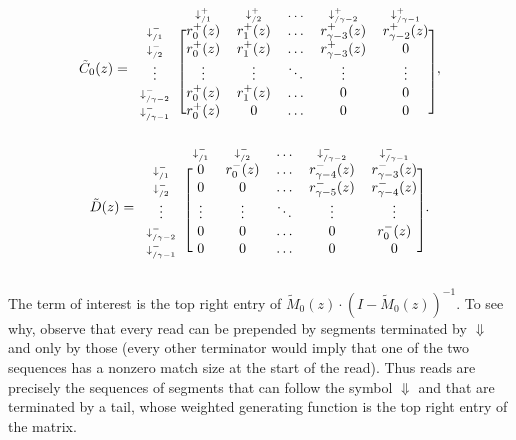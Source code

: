 \documentclass{article}
\begin{document}
\begin{equation*}
\tilde{C}_0(z) = 
\begin{blockarray}{cccccc}
   & \scriptstyle{\downarrow_{/1}^+} & \scriptstyle{\downarrow_{/2}^+} &
    \ldots & \scriptstyle{\downarrow_{/\gamma-2}^+} &
    \scriptstyle{\downarrow_{/\gamma-1}^+} \\
\begin{block}{c[ccccc]}
\scriptstyle{\downarrow_{/1}^-} & r_0^+(z) & r_1^+(z) & \ldots &
    r_{\gamma-3}^+(z) & r_{\gamma-2}^+(z) \\
\scriptstyle{\downarrow_{/2}^-} & r_0^+(z) & r_1^+(z) & \ldots &
    r_{\gamma-3}^+(z) & 0 \\
\vdots & \vdots & \vdots & \ddots & \vdots & \vdots \\
\scriptstyle{\downarrow_{/\gamma-2}^-} & r_0^+(z) & r_1^+(z) & \ldots &
    0 & 0 \\
\scriptstyle{\downarrow_{/\gamma-1}^-} & r_0^+(z) & 0 & \ldots & 0 & 0 \\
\end{block}
\end{blockarray},
\end{equation*}
\begin{equation*}
\tilde{D}(z) = 
\begin{blockarray}{cccccc}
   & \scriptstyle{\downarrow_{/1}^-} & \scriptstyle{\downarrow_{/2}^-} &
    \ldots & \scriptstyle{\downarrow_{/\gamma-2}^-} &
    \scriptstyle{\downarrow_{/\gamma-1}^-} \\
\begin{block}{c[ccccc]}
\scriptstyle{\downarrow_{/1}^-} & 0 & r_0^-(z) & \ldots &
    r_{\gamma-4}^-(z) & r_{\gamma-3}^-(z) \\
\scriptstyle{\downarrow_{/2}^-} & 0 & 0 & \ldots &
    r_{\gamma-5}^-(z) & r_{\gamma-4}^-(z) \\
\vdots & \vdots & \vdots & \ddots & \vdots & \vdots \\
\scriptstyle{\downarrow_{/\gamma-2}^-} & 0 & 0 & \ldots & 0 & r_0^-(z) \\
\scriptstyle{\downarrow_{/\gamma-1}^-} & 0 & 0 & \ldots & 0 & 0 \\
\end{block}
\end{blockarray}.
\end{equation*}

The term of interest is the top right entry of
$\tilde{M}_0(z)\cdot(I-\tilde{M}_0(z))^{-1}$. To see why, observe that
every read can be prepended by segments terminated by $\Downarrow$ and
only by those (every other terminator would imply that one of the two
sequences has a nonzero match size at the start of the read). Thus reads
are precisely the sequences of segments that can follow the symbol
$\Downarrow$ and that are terminated by a tail, whose weighted generating
function is the top right entry of the matrix.
\end{document}
